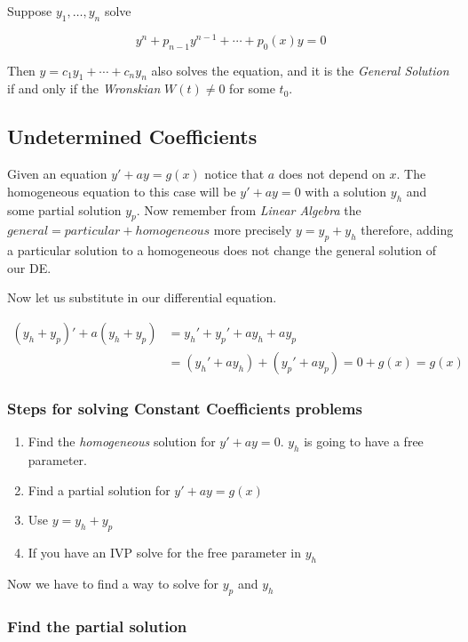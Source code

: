 Suppose \(y_1, \dots, y_n\) solve 

\[y^{n} + p_{n - 1}y^{n - 1}+ \cdots + p_0 (x)y = 0\]

Then \(y = c_1 y_1 + \cdots + c_n y_n\) also solves the equation, and it is the 
\emph{General Solution} if and only if the \emph{Wronskian} \(W(t) \ne 0\) for some \(t_0\).


\subsection{Undetermined Coefficients}

Given an equation \(y' + ay = g(x)\) notice that \(a\) does not depend on \(x\).
The homogeneous equation to this case will be \(y' + ay = 0\) with a solution \(y_h\) and some
partial solution \(y_p\). Now remember from \emph{Linear Algebra} the \(general = particular + homogeneous\)
more precisely \(y = y_p + y_h\) therefore, adding a particular solution to a homogeneous does not change
the general solution of our DE.
\vspace{\baselineskip}

Now let us substitute in our differential equation.

\begin{align*}
(y_h + y_p)' + a(y_h + y_p) &= y_h' + y_p' + ay_h + ay_p\\   
&= (y_h' + ay_h) + (y_p' + ay_p) = 0 + g(x) = g(x) 
\end{align*}

\subsubsection{Steps for solving Constant Coefficients problems}
\begin{enumerate}
    \item Find the \emph{homogeneous} solution for \(y' + ay = 0\). \(y_h\) is going
    to have a free parameter.
    \item Find a partial solution for \(y' + ay = g(x)\)
    \item Use \(y = y_h + y_p\)
    \item If you have an IVP solve for the free parameter in \(y_h\)
\end{enumerate}

Now we have to find a way to solve for \(y_p\) and \(y_h\)

\subsubsection{Find the partial solution}

